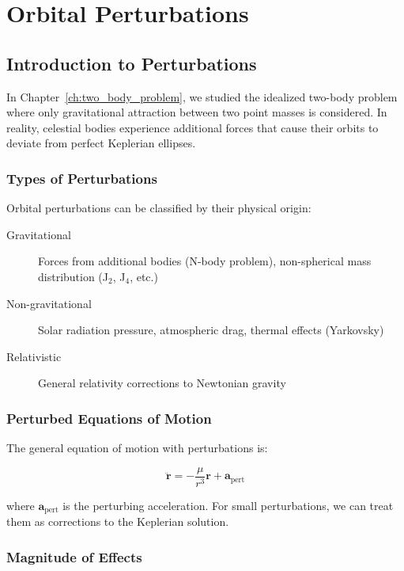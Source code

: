 \chapter{Orbital Perturbations}
\label{ch:perturbations}

\section{Introduction to Perturbations}

In Chapter~\ref{ch:two_body_problem}, we studied the idealized two-body problem where only gravitational attraction between two point masses is considered. In reality, celestial bodies experience additional forces that cause their orbits to deviate from perfect Keplerian ellipses.

\subsection{Types of Perturbations}

Orbital perturbations can be classified by their physical origin:

\begin{description}
    \item[Gravitational] Forces from additional bodies (N-body problem), non-spherical mass distribution (J$_2$, J$_4$, etc.)
    \item[Non-gravitational] Solar radiation pressure, atmospheric drag, thermal effects (Yarkovsky)
    \item[Relativistic] General relativity corrections to Newtonian gravity
\end{description}

\subsection{Perturbed Equations of Motion}

The general equation of motion with perturbations is:

\begin{equation}
    \ddot{\mathbf{r}} = -\frac{\mu}{r^3}\mathbf{r} + \mathbf{a}_{\text{pert}}
\end{equation}

where $\mathbf{a}_{\text{pert}}$ is the perturbing acceleration. For small perturbations, we can treat them as corrections to the Keplerian solution.

\subsection{Magnitude of Effects}

